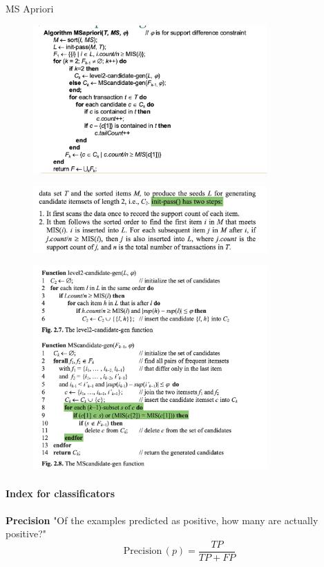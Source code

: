 \documentclass[12pt,oneside,a4paper]{article}
\begin{document}
MS Apriori
\begin{figure}[H]
    \centering
    \includegraphics[width=0.8\textwidth]{Images/MsApriori.png}
\end{figure}
\begin{figure}[H]
    \centering
    \includegraphics[width=0.8\textwidth]{Images/init_pass.png}
\end{figure}
\begin{figure}[H]
    \centering
    \includegraphics[width=0.8\textwidth]{Images/Candidate_gen_MS.png}
\end{figure}


\paragraph{Index for classificators}
\textbf{Precision} "Of the examples predicted as positive, how many are actually positive?"
\[
    \text{Precision} \, (p) = \frac{TP}{TP + FP}
\]
\end{document}
